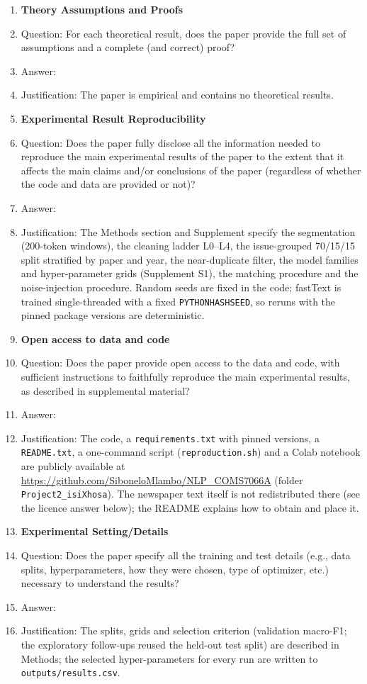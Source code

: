 \begin{enumerate}
\item {\bf Theory Assumptions and Proofs}
    \item[] Question: For each theoretical result, does the paper provide the full set of assumptions and a complete (and correct) proof?
    \item[] Answer: \answerNA{}
    \item[] Justification: The paper is empirical and contains no theoretical results.

\item {\bf Experimental Result Reproducibility}
    \item[] Question: Does the paper fully disclose all the information needed to reproduce the main experimental results of the paper to the extent that it affects the main claims and/or conclusions of the paper (regardless of whether the code and data are provided or not)?
    \item[] Answer: \answerYes{}
    \item[] Justification: The Methods section and Supplement specify the segmentation (200-token windows), the cleaning ladder L0--L4, the issue-grouped 70/15/15 split stratified by paper and year, the near-duplicate filter, the model families and hyper-parameter grids (Supplement S1), the matching procedure and the noise-injection procedure. Random seeds are fixed in the code; fastText is trained single-threaded with a fixed \texttt{PYTHONHASHSEED}, so reruns with the pinned package versions are deterministic.

\item {\bf Open access to data and code}
    \item[] Question: Does the paper provide open access to the data and code, with sufficient instructions to faithfully reproduce the main experimental results, as described in supplemental material?
    \item[] Answer: \answerYes{}
    \item[] Justification: The code, a \texttt{requirements.txt} with pinned versions, a \texttt{README.txt}, a one-command script (\texttt{reproduction.sh}) and a Colab notebook are publicly available at \url{https://github.com/SiboneloMlambo/NLP_COMS7066A} (folder \texttt{Project2\_isiXhosa}). The newspaper text itself is not redistributed there (see the licence answer below); the README explains how to obtain and place it.

\item {\bf Experimental Setting/Details}
    \item[] Question: Does the paper specify all the training and test details (e.g., data splits, hyperparameters, how they were chosen, type of optimizer, etc.) necessary to understand the results?
    \item[] Answer: \answerYes{}
    \item[] Justification: The splits, grids and selection criterion (validation macro-F1; the exploratory follow-ups reused the held-out test split) are described in Methods; the selected hyper-parameters for every run are written to \texttt{outputs/results.csv}.


\end{enumerate}
